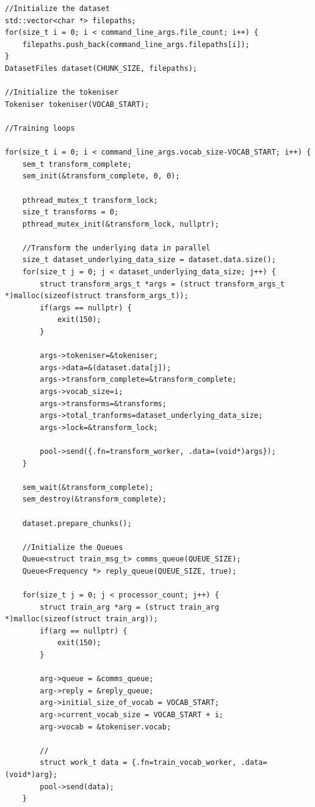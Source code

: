 \documentclass{article}
\begin{document}
\begin{verbatim}
//Initialize the dataset 
std::vector<char *> filepaths;
for(size_t i = 0; i < command_line_args.file_count; i++) {
    filepaths.push_back(command_line_args.filepaths[i]);
}
DatasetFiles dataset(CHUNK_SIZE, filepaths);

//Initialize the tokeniser
Tokeniser tokeniser(VOCAB_START);

//Training loops

for(size_t i = 0; i < command_line_args.vocab_size-VOCAB_START; i++) {
    sem_t transform_complete;
    sem_init(&transform_complete, 0, 0);

    pthread_mutex_t transform_lock;
    size_t transforms = 0;
    pthread_mutex_init(&transform_lock, nullptr);

    //Transform the underlying data in parallel
    size_t dataset_underlying_data_size = dataset.data.size();
    for(size_t j = 0; j < dataset_underlying_data_size; j++) {
        struct transform_args_t *args = (struct transform_args_t *)malloc(sizeof(struct transform_args_t));
        if(args == nullptr) {
            exit(150);
        }
        
        args->tokeniser=&tokeniser;
        args->data=&(dataset.data[j]); 
        args->transform_complete=&transform_complete;
        args->vocab_size=i;
        args->transforms=&transforms;
        args->total_tranforms=dataset_underlying_data_size;
        args->lock=&transform_lock;

        pool->send({.fn=transform_worker, .data=(void*)args});
    }

    sem_wait(&transform_complete);
    sem_destroy(&transform_complete);

    dataset.prepare_chunks();

    //Initialize the Queues
    Queue<struct train_msg_t> comms_queue(QUEUE_SIZE);
    Queue<Frequency *> reply_queue(QUEUE_SIZE, true);

    for(size_t j = 0; j < processor_count; j++) {
        struct train_arg *arg = (struct train_arg *)malloc(sizeof(struct train_arg));
        if(arg == nullptr) {
            exit(150);
        }

        arg->queue = &comms_queue;
        arg->reply = &reply_queue;
        arg->initial_size_of_vocab = VOCAB_START;
        arg->current_vocab_size = VOCAB_START + i;
        arg->vocab = &tokeniser.vocab;

        //
        struct work_t data = {.fn=train_vocab_worker, .data=(void*)arg};
        pool->send(data);
    }


\end{verbatim}
\end{document}
